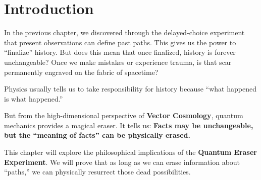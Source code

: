 \section{Introduction}

In the previous chapter, we discovered through the delayed-choice experiment that present observations can define past paths. This gives us the power to ``finalize'' history. But does this mean that once finalized, history is forever unchangeable? Once we make mistakes or experience trauma, is that scar permanently engraved on the fabric of spacetime?

Physics usually tells us to take responsibility for history because ``what happened is what happened.''

But from the high-dimensional perspective of \textbf{Vector Cosmology}, quantum mechanics provides a magical eraser. It tells us: \textbf{Facts may be unchangeable, but the ``meaning of facts'' can be physically erased.}

This chapter will explore the philosophical implications of the \textbf{Quantum Eraser Experiment}. We will prove that as long as we can erase information about ``paths,'' we can physically resurrect those dead possibilities.

